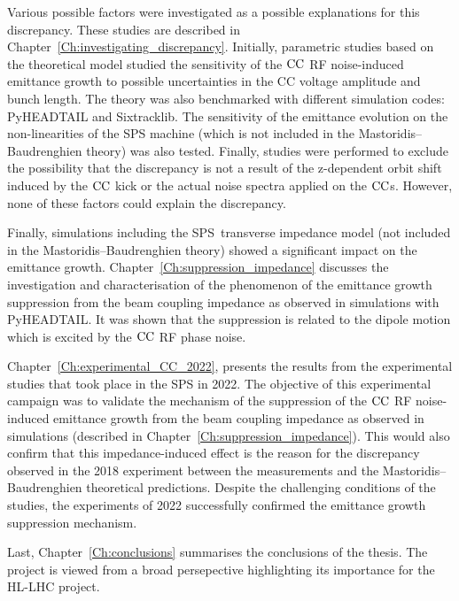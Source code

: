 Various possible factors were investigated as a possible explanations for this discrepancy. These studies are described in Chapter~\ref{Ch:investigating_discrepancy}. Initially, parametric studies based on the theoretical model studied the sensitivity of the ${\mathrm{CC}}$ RF noise-induced emittance growth to possible uncertainties in the CC voltage amplitude and bunch length. The theory was also benchmarked with different simulation codes: PyHEADTAIL and Sixtracklib. The sensitivity of the emittance evolution on the non-linearities of the SPS machine (which is not included in the Mastoridis--Baudrenghien theory) was also tested. Finally, studies were performed to exclude the possibility that the discrepancy is not a result of the z-dependent orbit shift induced by the ${\mathrm{CC}}$ kick or the actual noise spectra applied on the ${\mathrm{CC}}$s. However, none of these factors could explain the discrepancy.

Finally, simulations including the SPS transverse impedance model (not included in the Mastoridis--Baudrenghien theory) showed a significant impact on the emittance growth. Chapter~\ref{Ch:suppression_impedance} discusses the investigation and characterisation of the phenomenon of the emittance growth suppression from the beam coupling impedance as observed in simulations with PyHEADTAIL. It was shown that the suppression is related to the dipole motion which is excited by the ${\mathrm{CC}}$ RF phase noise.

Chapter~\ref{Ch:experimental_CC_2022}, presents the results from the experimental studies that took place in the SPS in 2022. The objective of this experimental campaign was to validate the mechanism of the suppression of the ${\mathrm{CC}}$ RF noise-induced emittance growth from the beam coupling impedance as observed in simulations (described in Chapter~\ref{Ch:suppression_impedance}). This would also confirm that this impedance-induced effect is the reason for the discrepancy observed in the 2018 experiment between the measurements and the Mastoridis--Baudrenghien theoretical predictions. Despite the challenging conditions of the studies, the experiments of 2022 successfully confirmed the emittance growth suppression mechanism.%


Last, Chapter~\ref{Ch:conclusions} summarises the conclusions of the thesis. The project is viewed from a broad persepective highlighting its importance for the HL-LHC project. %